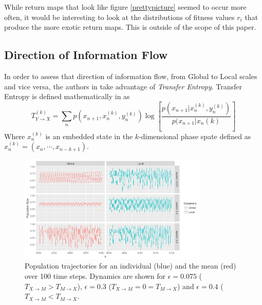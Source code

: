 \documentclass[conference]{IEEEtran}
\begin{document}
    

While return maps that look like figure \ref{prettypicture} seemed to occur more often, it would be interesting to look at the distributions of fitness values $r_i$ that produce the more exotic return maps.  This is outside of the scope of this paper.


\subsection{Direction of Information Flow}
\noindent In order to assess that direction of information flow, from Global to Local scales and vice versa, the authors in \cite{Walker} take advantage of {\it Transfer Entropy}. Transfer Entropy is defined mathematically in \cite{Schreiber} as
$$T^{(k)}_{Y \rightarrow X} = \sum_n p(x_{n+1}, x_n^{(k)}, y_n^{(k)}) \log \left[ \frac{p(x_{n+1}|x_n^{(k)}, y_n^{(k)})}{p(x_{n+1}|x_n{(k)}}\right]$$
Where $x_n^{(k)}$ is an embedded state in the $k$-dimensional phase spate defined as $x_n^{(k)} = (x_n, \cdots, x_{n-k+1})$. \\
\begin{figure}[t]
\centering
 \includegraphics[width=90mm]{Fig5}
    
  \caption{Population trajectories for an individual (blue) and the mean (red) over 100 time steps. Dynamics are shown for $\epsilon = 0.075$ ($T_{X\rightarrow M} > T_{M\rightarrow X}$), $\epsilon = 0.3$ ($T_{X\rightarrow M} = 0 = T_{M\rightarrow X}$) and $\epsilon = 0.4$ ($T_{X\rightarrow M} < T_{M\rightarrow X}$. }
 \label{timeseries}
\end{figure}
\end{document}
